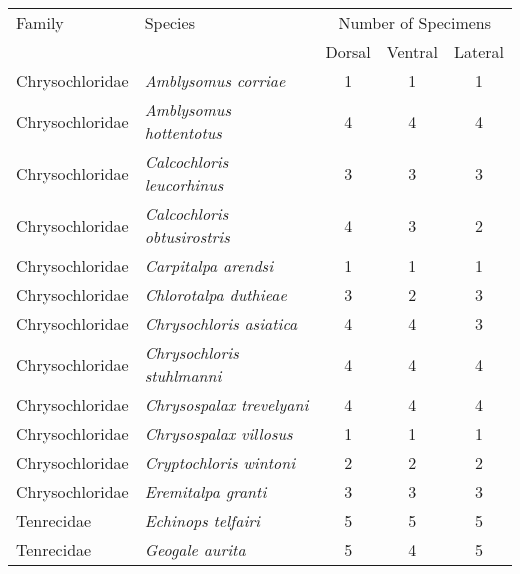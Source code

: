 
\begin{tabular}[t]{l l c c c}		
\hline
Family & Species & \multicolumn{3}{c}{Number of Specimens}\\
\cline{3-5}
 &  & Dorsal & Ventral & Lateral\\
\hline
Chrysochloridae & \textit{Amblysomus corriae} & 1 & 1 & 1\\
Chrysochloridae & \textit{Amblysomus hottentotus} & 4 & 4 & 4 \\
Chrysochloridae & \textit{Calcochloris leucorhinus} & 3 & 3 & 3 \\
Chrysochloridae & \textit{Calcochloris obtusirostris} & 4 & 3 & 2 \\
Chrysochloridae & \textit{Carpitalpa arendsi} & 1 & 1 & 1\\
Chrysochloridae & \textit{Chlorotalpa duthieae} & 3 & 2 & 3\\
Chrysochloridae & \textit{Chrysochloris asiatica} & 4 & 4 & 3 \\
Chrysochloridae & \textit{Chrysochloris stuhlmanni} & 4 & 4 & 4 \\
Chrysochloridae & \textit{Chrysospalax trevelyani} & 4 & 4 & 4 \\
Chrysochloridae & \textit{Chrysospalax villosus} & 1 & 1 & 1\\
Chrysochloridae & \textit{Cryptochloris wintoni} & 2 & 2 & 2\\
Chrysochloridae & \textit{Eremitalpa granti} & 3 & 3 & 3\\
Tenrecidae & \textit{Echinops telfairi} & 5 & 5 & 5\\
Tenrecidae & \textit{Geogale aurita} & 5 & 4 & 5\\

\end{tabular}
